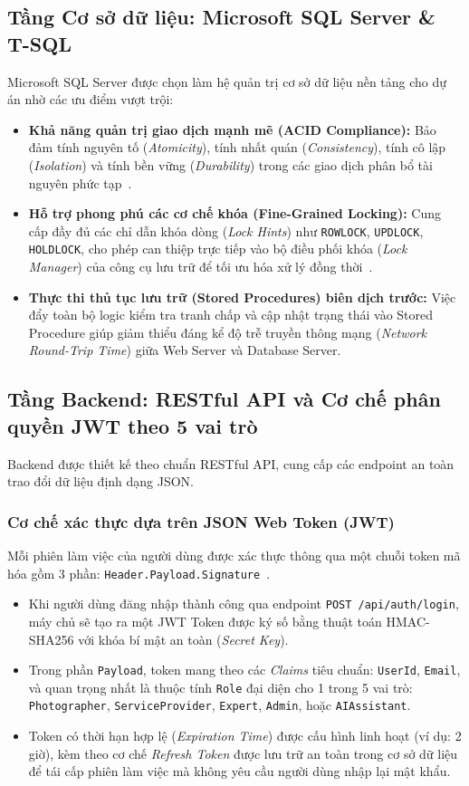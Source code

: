 \subsection{Tầng Cơ sở dữ liệu: Microsoft SQL Server \& T-SQL}
Microsoft SQL Server được chọn làm hệ quản trị cơ sở dữ liệu nền tảng cho dự án nhờ các ưu điểm vượt trội:
\begin{itemize}[leftmargin=2em]
    \item \textbf{Khả năng quản trị giao dịch mạnh mẽ (ACID Compliance):} Bảo đảm tính nguyên tố (\textit{Atomicity}), tính nhất quán (\textit{Consistency}), tính cô lập (\textit{Isolation}) và tính bền vững (\textit{Durability}) trong các giao dịch phân bổ tài nguyên phức tạp~\cite{silberschatz2020database}.
    \item \textbf{Hỗ trợ phong phú các cơ chế khóa (Fine-Grained Locking):} Cung cấp đầy đủ các chỉ dẫn khóa dòng (\textit{Lock Hints}) như \texttt{ROWLOCK}, \texttt{UPDLOCK}, \texttt{HOLDLOCK}, cho phép can thiệp trực tiếp vào bộ điều phối khóa (\textit{Lock Manager}) của công cụ lưu trữ để tối ưu hóa xử lý đồng thời~\cite{microsoft2024locking}.
    \item \textbf{Thực thi thủ tục lưu trữ (Stored Procedures) biên dịch trước:} Việc đẩy toàn bộ logic kiểm tra tranh chấp và cập nhật trạng thái vào Stored Procedure giúp giảm thiểu đáng kể độ trễ truyền thông mạng (\textit{Network Round-Trip Time}) giữa Web Server và Database Server.
\end{itemize}

\subsection{Tầng Backend: RESTful API và Cơ chế phân quyền JWT theo 5 vai trò}
Backend được thiết kế theo chuẩn RESTful API, cung cấp các endpoint an toàn trao đổi dữ liệu định dạng JSON.

\subsubsection{Cơ chế xác thực dựa trên JSON Web Token (JWT)}
Mỗi phiên làm việc của người dùng được xác thực thông qua một chuỗi token mã hóa gồm 3 phần: \texttt{Header.Payload.Signature}~\cite{nugraha2023performance}.
\begin{itemize}[leftmargin=2em]
    \item Khi người dùng đăng nhập thành công qua endpoint \texttt{POST /api/auth/login}, máy chủ sẽ tạo ra một JWT Token được ký số bằng thuật toán HMAC-SHA256 với khóa bí mật an toàn (\textit{Secret Key}).
    \item Trong phần \texttt{Payload}, token mang theo các \textit{Claims} tiêu chuẩn: \texttt{UserId}, \texttt{Email}, và quan trọng nhất là thuộc tính \texttt{Role} đại diện cho 1 trong 5 vai trò: \texttt{Photographer}, \texttt{ServiceProvider}, \texttt{Expert}, \texttt{Admin}, hoặc \texttt{AIAssistant}.
    \item Token có thời hạn hợp lệ (\textit{Expiration Time}) được cấu hình linh hoạt (ví dụ: 2 giờ), kèm theo cơ chế \textit{Refresh Token} được lưu trữ an toàn trong cơ sở dữ liệu để tái cấp phiên làm việc mà không yêu cầu người dùng nhập lại mật khẩu.
\end{itemize}

